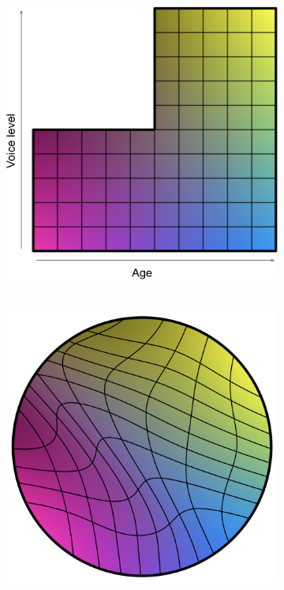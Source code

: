 \begin{figure}
    \centering
    \begin{subfigure}{.3\textwidth}
        \centering
        \includegraphics[width=\textwidth]{images/latent_space_disentanglement_a.png}
        \caption{~\citep{karras2019style}}
        \label{fig:feature_space_disentanglement_a}
    \end{subfigure}%
    \hfill
    \begin{subfigure}{.3\textwidth}
        \centering
        \includegraphics[width=\textwidth]{images/latent_space_disentanglement_b.png}

\end{subfigure}
\end{figure}
